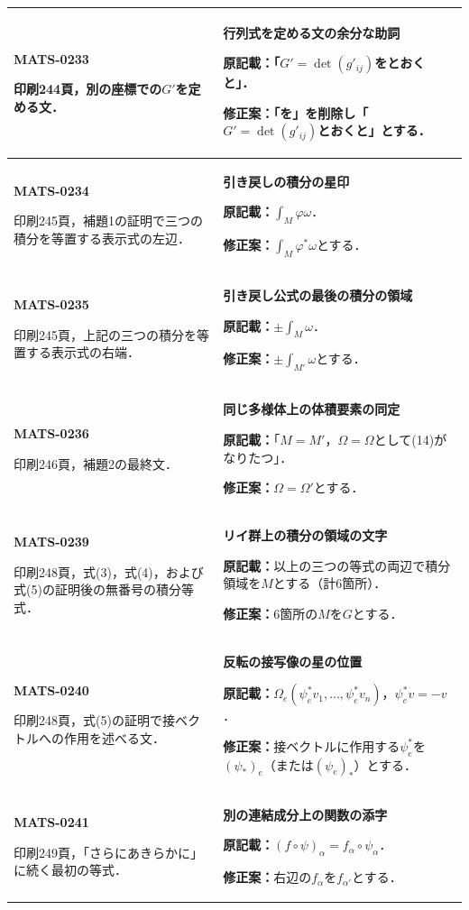\documentclass[a4paper,10pt]{ltjsarticle}
\begin{document}
\begin{longtable}{@{}>{\raggedright\arraybackslash}p{.19\linewidth}>{\raggedright\arraybackslash}p{.77\linewidth}@{}}
\hline
\hypertarget{MATS-0233}{}\textbf{MATS-0233}\par 印刷244頁，別の座標での$G'$を定める文． & \textbf{行列式を定める文の余分な助詞}\par\textbf{原記載：}「$G'=\det(g'_{ij})$をとおくと」．\par\textbf{修正案：}「を」を削除し「$G'=\det(g'_{ij})$とおくと」とする． \\[3pt]
\hline
\hypertarget{MATS-0234}{}\textbf{MATS-0234}\par 印刷245頁，補題1の証明で三つの積分を等置する表示式の左辺． & \textbf{引き戻しの積分の星印}\par\textbf{原記載：}$\int_M\varphi\omega$．\par\textbf{修正案：}$\int_M\varphi^*\omega$とする． \\[3pt]
\hline
\hypertarget{MATS-0235}{}\textbf{MATS-0235}\par 印刷245頁，上記の三つの積分を等置する表示式の右端． & \textbf{引き戻し公式の最後の積分の領域}\par\textbf{原記載：}$\pm\int_M\omega$．\par\textbf{修正案：}$\pm\int_{M'}\omega$とする． \\[3pt]
\hline
\hypertarget{MATS-0236}{}\textbf{MATS-0236}\par 印刷246頁，補題2の最終文． & \textbf{同じ多様体上の体積要素の同定}\par\textbf{原記載：}「$M=M'$，$\Omega=\Omega$として(14)がなりたつ」．\par\textbf{修正案：}$\Omega=\Omega'$とする． \\[3pt]
\hline
\hypertarget{MATS-0239}{}\textbf{MATS-0239}\par 印刷248頁，式(3)，式(4)，および式(5)の証明後の無番号の積分等式． & \textbf{リイ群上の積分の領域の文字}\par\textbf{原記載：}以上の三つの等式の両辺で積分領域を$M$とする（計6箇所）．\par\textbf{修正案：}6箇所の$M$を$G$とする． \\[3pt]
\hline
\hypertarget{MATS-0240}{}\textbf{MATS-0240}\par 印刷248頁，式(5)の証明で接ベクトルへの作用を述べる文． & \textbf{反転の接写像の星の位置}\par\textbf{原記載：}$\Omega_e(\psi_e^*v_1,\ldots,\psi_e^*v_n)$，$\psi_e^*v=-v$．\par\textbf{修正案：}接ベクトルに作用する$\psi_e^*$を$(\psi_*)_e$（または$(\psi_e)_*$）とする． \\[3pt]
\hline
\hypertarget{MATS-0241}{}\textbf{MATS-0241}\par 印刷249頁，「さらにあきらかに」に続く最初の等式． & \textbf{別の連結成分上の関数の添字}\par\textbf{原記載：}$(f\circ\psi)_\alpha=f_\alpha\circ\psi_\alpha$．\par\textbf{修正案：}右辺の$f_\alpha$を$f_{\alpha'}$とする． \\[3pt]

\end{longtable}
\end{document}
